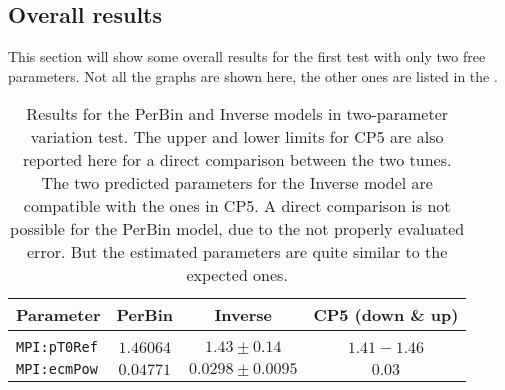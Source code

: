 \clearpage
\subsection{Overall results}
\label{subsec:Overall2PARAMS}

This section will show some overall results for the first test with only two free parameters. Not all the graphs are shown here, the other ones are listed in the  .

\begin{table}[!htb]
\centering
	\begin{tabular}{l | c | c | c}
		Parameter & PerBin & Inverse & CP5 (down \& up)\\ \hline\hline
		\\[-0.85em]		
		\texttt{MPI:pT0Ref} & $ 1.46064$ & $ 1.43 \pm 0.14 $ & $1.41 - 1.46$ \\[2pt]
		\texttt{MPI:ecmPow} & $ 0.04771$ & $ 0.0298 \pm 0.0095 $ & $0.03$\\[2pt]
	\end{tabular}
	\caption{Results for the PerBin and Inverse models in two-parameter variation test. The upper and lower limits for CP5 are also reported here for a direct comparison between the two tunes.
The two predicted parameters for the Inverse model are compatible with the ones in CP5. A direct comparison is not possible for the PerBin model, due to the not properly evaluated error. But the  estimated parameters are quite similar to the expected ones.}
	\label{table:ResultInverse_2params}
\end{table}


